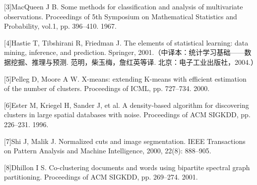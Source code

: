\documentclass[UTF8, 12pt, fontset=fandol, oneside]{ctexart}
\begin{document}
[3]\quad MacQueen J B. Some methods for classification and analysis of multivariate observations. Proceedings of 5th Symposium on Mathematical Statistics and Probability, vol.1, pp. 396--410. 1967.

[4]\quad Hastie T, Tibshirani R, Friedman J. The elements of statistical learning: data mining, inference, and prediction. Springer, 2001.（中译本：统计学习基础——数据挖掘、推理与预测. 范明，柴玉梅，詹红英等译. 北京：电子工业出版社，2004.）

[5]\quad Pelleg D, Moore A W. X-means: extending K-means with efficient estimation of the number of clusters. Proceedings of ICML, pp. 727--734. 2000.

[6]\quad Ester M, Kriegel H, Sander J, et al. A density-based algorithm for discovering clusters in large spatial databases with noise. Proceedings of ACM SIGKDD, pp. 226--231. 1996.

[7]\quad Shi J, Malik J. Normalized cuts and image segmentation. IEEE Transactions on Pattern Analysis and Machine Intelligence, 2000, 22(8): 888--905.

[8]\quad Dhillon I S. Co-clustering documents and words using bipartite spectral graph partitioning. Proceedings of ACM SIGKDD, pp. 269--274. 2001.
\end{document}
